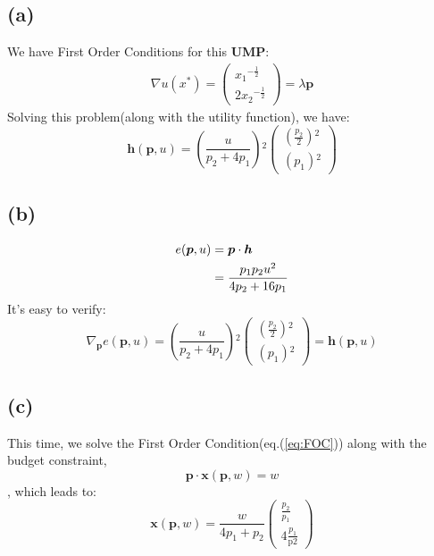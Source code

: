 \documentclass{article}
\begin{document}
\subsection{(a)}
We have First Order Conditions for this {\bf UMP}:
\begin{align} \label{eq:FOC}
	\nabla{u(x^{*})} =
		\left(
			\begin{array}{c}
			 x_1{}^{-\frac{1}{2}} \\
			 2x_2{}^{-\frac{1}{2}}
			\end{array}
		\right) 
	=\lambda\bm{p}
\end{align}
Solving this problem(along with the utility function), we have:
\begin{equation}
	 \bm{h}(\bm{p},u) = 
	\left(\frac{u}{p_2+4p_1}\right){}^2\left(
		\begin{array}{c}
		\left(\frac{p_2}{2}\right){}^2 \\
		\left(p_1\right){}^2
		\end{array}
	\right)
\end{equation}

\subsection{(b)}
\begin{align}
\notag 
e(\bm{p},u) &= \bm{p} \cdot \bm{h}\\
	   &= \frac{p_{1}p_{2}u^2}{4p_2+16p_1} \label{eq:exp}
\end{align}
It's easy to verify:
\begin{equation}
	\nabla_{\bm{p}} e(\bm{p},u) = 
		\left(\frac{u}{p_2+4p_1}\right){}^2\left(
				\begin{array}{c}
				\left(\frac{p_2}{2}\right){}^2 \\
				\left(p_1\right){}^2
				\end{array}
		\right)
	= \bm{h}(\bm{p},u)
\end{equation}
\subsection{(c)}
This time, we solve the First Order Condition(eq.(\ref{eq:FOC})) along with the budget constraint,
\begin{equation}
	\bm{p}\cdot\bm{x}(\bm{p},w)=w
\end{equation}
, which leads to:
\begin{equation}
	\bm{x}(\bm{p},w) = 
		\frac{w}{4p_1+p_2}\left(
		\begin{array}{c}
		\frac{p_2}{p_1} \\
		4\frac{p_1}{\text{p2}}
		\end{array}
		\right)
\end{equation}
\end{document}
